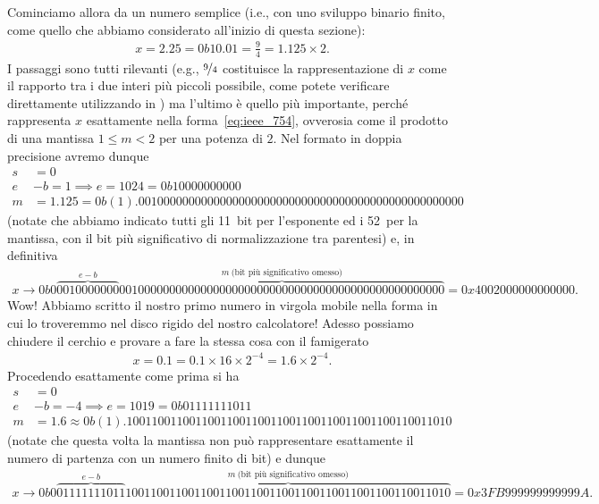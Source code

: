 Cominciamo allora da un numero semplice (i.e., con uno sviluppo binario finito,
come quello che abbiamo considerato all'inizio di questa sezione):
\begin{align*}
  x = 2.25 = 0b10.01 = \frac{9}{4} = 1.125 \times 2.
\end{align*}
I passaggi sono tutti rilevanti (e.g., $\nicefrac{9}{4}$ costituisce la
rappresentazione di $x$ come il rapporto tra i due interi più piccoli possibile,
come potete verificare direttamente utilizzando  in \python)
ma l'ultimo è quello più importante, perché rappresenta $x$ esattamente
nella forma~\eqref{eq:ieee_754}, ovverosia come il prodotto di una mantissa
$1 \leq m < 2$ per una potenza di $2$.
Nel formato in doppia precisione avremo dunque
\begin{align*}
  s & = 0\\
  e & - b = 1 \implies e = 1024 =  0b10000000000\\
  m & = 1.125 = 0b(1).0010000000000000000000000000000000000000000000000000
\end{align*}
(notate che abbiamo indicato tutti gli 11~bit per l'esponente ed i 52~per la
mantissa, con il bit più significativo di normalizzazione tra parentesi) e,
in definitiva
\begin{align*}
  x \rightarrow 0b0\overbrace{0010000000}^{e-b}
  \overbrace{0010000000000000000000000000000000000000000000000000}^{m~\text{(bit più significativo omesso)}}
  = 0x4002000000000000 .
\end{align*}
Wow! Abbiamo scritto il nostro primo numero in virgola mobile nella forma in
cui lo troveremmo nel disco rigido del nostro calcolatore! Adesso possiamo
chiudere il cerchio e provare a fare la stessa cosa con il famigerato
\begin{align*}
  x = 0.1 = 0.1 \times 16 \times 2^{-4} = 1.6 \times 2^{-4}.
\end{align*}
Procedendo esattamente come prima si ha
\begin{align*}
  s & = 0 \\
  e & - b = - 4 \implies e = 1019 = 0b01111111011\\
  m & = 1.6 \approx 0b(1).1001100110011001100110011001100110011001100110011010
\end{align*}
(notate che questa volta la mantissa non può rappresentare esattamente il numero di
partenza con un numero finito di bit) e dunque
\begin{align*}
  x \rightarrow 0b0\overbrace{01111111011}^{e-b}
  \overbrace{1001100110011001100110011001100110011001100110011010}^{m~\text{(bit più significativo omesso)}}
  = 0x3FB999999999999A.
\end{align*}

